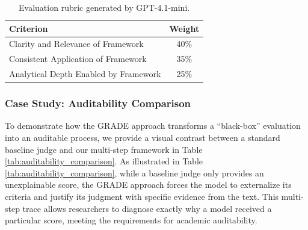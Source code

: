 \documentclass[11pt]{article}
\begin{document}
\begin{table}[h]
\vspace{1em} %

\begin{subtable}{\textwidth}
    \centering
    \caption{Evaluation rubric generated by GPT-4.1-mini.}
    \label{tab:rubric_gpt41}
    \begin{tabularx}{0.8\textwidth}{X c}
        \toprule
        \textbf{Criterion} & \textbf{Weight} \\
        \midrule
        Clarity and Relevance of Framework & 40\% \\
        Consistent Application of Framework & 35\% \\
        Analytical Depth Enabled by Framework & 25\% \\
        \bottomrule
    \end{tabularx}
\end{subtable}

\end{table}

\subsubsection{Case Study: Auditability Comparison}
\label{appendix:g22_comparison}

To demonstrate how the GRADE approach transforms a ``black-box'' evaluation into an auditable process, we provide a visual contrast between a standard baseline judge and our multi-step framework in Table \ref{tab:auditability_comparison}. As illustrated in Table \ref{tab:auditability_comparison}, while a baseline judge only provides an unexplainable score, the GRADE approach forces the model to externalize its criteria and justify its judgment with specific evidence from the text. This multi-step trace allows researchers to diagnose exactly why a model received a particular score, meeting the requirements for academic auditability.
\end{document}
